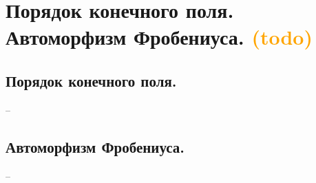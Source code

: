 \section{Порядок конечного поля. Автоморфизм Фробениуса. \textcolor{orange}{(todo)}}

\subsection{Порядок конечного поля.}
--

\subsection{Автоморфизм Фробениуса.}
--
